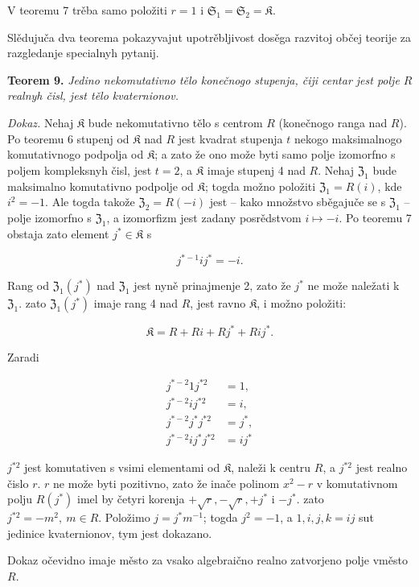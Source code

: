 \documentclass[11pt]{article}
\begin{document}
V teoremu 7 trěba samo položiti \(r=1\) i \(\mathfrak S_1=\mathfrak S_2=\mathfrak K\).

Slědujuča dva teorema pokazyvajut upotrěbljivost dosěga razvitoj občej teorije za razgledanje specialnyh pytanij.

\textbf{Teorem 9.} \emph{Jedino nekomutativno tělo konečnogo stupenja, čiji centar jest polje \(R\) realnyh čisl, jest tělo kvaternionov.}

\emph{Dokaz.} Nehaj \(\mathfrak K\) bude nekomutativno tělo s centrom \(R\) (konečnogo ranga nad \(R\)). Po teoremu 6 stupenj od \(\mathfrak K\) nad \(R\) jest kvadrat stupenja \(t\) nekogo maksimalnogo komutativnogo podpolja od \(\mathfrak K\); a zato že ono može byti samo polje izomorfno s poljem kompleksnyh čisl, jest \(t=2\), a \(\mathfrak K\) imaje stupenj 4 nad \(R\). Nehaj \(\mathfrak Z_1\) bude maksimalno komutativno podpolje od \(\mathfrak K\); togda možno položiti \(\mathfrak Z_1=R(i)\), kde \(i^2=-1\). Ale togda takože \(\mathfrak Z_2=R(-i)\) jest -- kako množstvo sběgajuče se s \(\mathfrak Z_1\) -- polje izomorfno s \(\mathfrak Z_1\), a izomorfizm jest zadany posrědstvom \(i\mapsto -i\). Po teoremu 7 obstaja zato element \(j^*\in\mathfrak K\) s

\[
j^{*-1}ij^*=-i.
\]

Rang od \(\mathfrak Z_1(j^*)\) nad \(\mathfrak Z_1\) jest nyně prinajmenje 2, zato že \(j^*\) ne može naležati k \(\mathfrak Z_1\). zato \(\mathfrak Z_1(j^*)\) imaje rang 4 nad \(R\), jest ravno \(\mathfrak K\), i možno položiti:

\[
\mathfrak K=R+Ri+Rj^*+Rij^*.
\]

Zaradi

\[
\begin{aligned}
j^{*-2}1j^{*2}&=1,\\
j^{*-2}ij^{*2}&=i,\\
j^{*-2}j^*j^{*2}&=j^*,\\
j^{*-2}ij^*j^{*2}&=ij^*
\end{aligned}
\]

\(j^{*2}\) jest komutativen s vsimi elementami od \(\mathfrak K\), naleži k centru \(R\), a \(j^{*2}\) jest realno čislo \(r\). \(r\) ne može byti pozitivno, zato že inače polinom \(x^2-r\) v komutativnom polju \(R(j^*)\) imel by četyri korenja \(+\sqrt r,-\sqrt r,+j^*\) i \(-j^*\). zato \(j^{*2}=-m^2,\ m\in R\). Položimo \(j=j^*m^{-1}\); togda \(j^2=-1\), a \(1,i,j,k=ij\) sut jedinice kvaternionov, tym jest dokazano.

Dokaz očevidno imaje město za vsako algebraično realno zatvorjeno polje vměsto \(R\).
\end{document}
